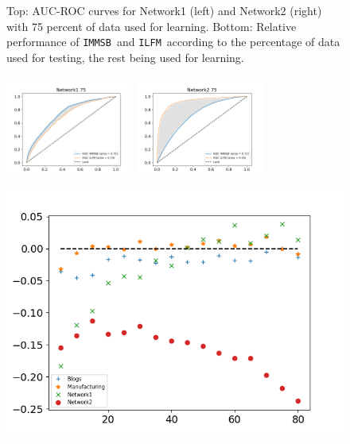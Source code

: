\documentclass[french]{hermes-journal}
\newcommand{\ilfm}{\texttt{ILFM}}
\newcommand{\immsb}{\texttt{IMMSB}}
\begin{document}
\begin{figure}[h] {Top: AUC-ROC curves for Network1 (left) and Network2 (right) with 75 percent of data used for learning. Bottom: Relative performance of \immsb\ and \ilfm\ according to the percentage of data used for testing, the rest being used for learning.} 
    \begin{minipage}{0.4\textwidth}
        \includegraphics[width=4.22cm,height=3.5cm]{img/corpus/roc_network1_75_f}
    \end{minipage}
    \begin{minipage}{0.4\textwidth}
        \includegraphics[width=4.22cm,height=3.5cm]{img/corpus/roc_network2_75_f}
    \end{minipage}
    \begin{minipage}{0.5\textwidth}
        \includegraphics[width=\textwidth]{img/corpus/testset_max_20.png}
    \end{minipage}
\label{fig:auc}
\end{figure}
\end{document}
